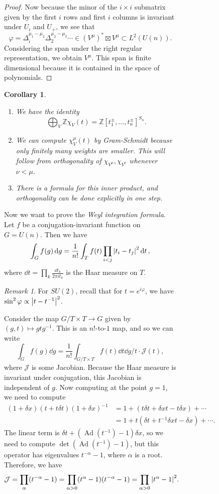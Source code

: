 \documentclass[leqno, openany]{memoir}
\newtheorem{cor}[thm]{Corollary}
\theoremstyle{definition}
\theoremstyle{remark}
\newtheorem{rmk}[thm]{Remark}
\theoremstyle{plain}
\theoremstyle{definition}
\theoremstyle{remark}
\newcommand{\Z}{\mathbb{Z}}
\newcommand{\mc}[1]{\mathcal{#1}}
\DeclareMathOperator{\Ad}{Ad}
\begin{document}
\begin{figure}[H]
\begin{figure}[H]
\begin{proof}
    Now because the minor of the $i \times i$ submatrix given by the first $i$
    rows and first $i$ columns is invariant under $U_i$ and $U_+$, we see that
    \[ \varphi = \Delta_i^{\mu_1 - \mu_2} \Delta_2^{\mu_2 - \mu_3} \cdots \in
    (V^{\mu})^* \boxtimes V^{\mu} \subset L^2(U(n)). \] Considering the span
under the right regular representation, we obtain $V^{\mu}$. This span is
finite dimensional because it is contained in the space of polynomials.
\end{proof}

\begin{cor} \begin{enumerate} \item We have the identity \[ \bigoplus_V \Z
\chi_V(t) = {\Z[t_1^{\pm}, \ldots, t_n^{\pm}]}^{S_n}. \] \item We can compute
$\chi_V^{\mu}(t)$ by Gram-Schmidt because only finitely many weights are
smaller. This will follow from orthogonality of $\chi_{V^{\mu}},
\chi_{V^{\nu}}$ whenever $\nu < \mu$.  \item There is a formula for this inner
product, and orthogonality can be done explicitly in one step.  \end{enumerate}
            \end{cor}

Now we want to prove the \textit{Weyl integration formula}. Let $f$ be a
conjugation-invariant function on $G = U(n)$. Then we have \[ \int_G f(g)
\dd{g} = \frac{1}{n!} \int_T f(t) \prod_{i < j} \abs{t_i - t_j}^2 \dd{t}, \]
where $\dd{t} = \prod_k \frac{\dd{t}_k}{2 \pi i t_k}$ is the Haar measure on
$T$.

\begin{rmk} For $SU(2)$, recall that for $t = e^{i \varphi}$, we have $\sin^2
\varphi \propto \abs{t-t^{-1}}^2$.  \end{rmk}

Consider the map $G/T \times T \to G$ given by $(g,t) \mapsto gtg^{-1}$. This
is an $n!$-to-$1$ map, and so we can write \[ \int_G f(g) \dd{g} = \frac{1}{n!}
\int_{G/T \times T} f(t) \dd{t} \dd{g/t} \cdot \mc{J}(t), \] where $\mc{J}$ is
some Jacobian. Because the Haar measure is invariant under conjugation, this
Jacobian is independent of $g$. Now computing at the point $g = 1$, we need to
compute \begin{align*} (1+\delta x)(t + t \delta t)(1+\delta x)^{-1} &= 1 + (t
\delta t + \delta x t - t \delta x) + \cdots \\ &= 1 + t(\delta t + t^{-1}
\delta x t - \delta x) + \cdots.  \end{align*} The linear term is $\delta t +
(\Ad(t^{-1}) - 1) \delta x$, so we need to compute $\det (\Ad(t^{-1}) - 1)$,
but this operator has eigenvalues $t^{-\alpha} - 1$, where $\alpha$ is a root.
Therefore, we have \[ \mc{J} = \prod_{\alpha}(t^{-\alpha} - 1) = \prod_{\alpha
> 0} (t^{\alpha}-1)(t^{-\alpha}-1) = \prod_{\alpha > 0} \abs{t^{\alpha}-1}^2.
\]


\end{figure}
\end{figure}
\end{document}
